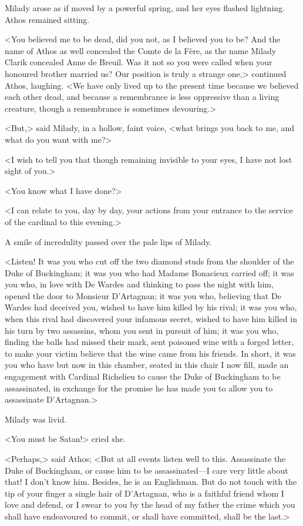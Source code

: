 Milady arose as if moved by a powerful spring, and her eyes flashed lightning. Athos remained sitting. 

<You believed me to be dead, did you not, as I believed you to be? And the name of Athos as well concealed the Comte de la Fère, as the name Milady Clarik concealed Anne de Breuil. Was it not so you were called when your honoured brother married us? Our position is truly a strange one,> continued Athos, laughing. <We have only lived up to the present time because we believed each other dead, and because a remembrance is less oppressive than a living creature, though a remembrance is sometimes devouring.> 

<But,> said Milady, in a hollow, faint voice, <what brings you back to me, and what do you want with me?> 

<I wish to tell you that though remaining invisible to your eyes, I have not lost sight of you.> 

<You know what I have done?> 

<I can relate to you, day by day, your actions from your entrance to the service of the cardinal to this evening.> 

A smile of incredulity passed over the pale lips of Milady. 

<Listen! It was you who cut off the two diamond studs from the shoulder of the Duke of Buckingham; it was you who had Madame Bonacieux carried off; it was you who, in love with De Wardes and thinking to pass the night with him, opened the door to Monsieur D'Artagnan; it was you who, believing that De Wardes had deceived you, wished to have him killed by his rival; it was you who, when this rival had discovered your infamous secret, wished to have him killed in his turn by two assassins, whom you sent in pursuit of him; it was you who, finding the balls had missed their mark, sent poisoned wine with a forged letter, to make your victim believe that the wine came from his friends. In short, it was you who have but now in this chamber, seated in this chair I now fill, made an engagement with Cardinal Richelieu to cause the Duke of Buckingham to be assassinated, in exchange for the promise he has made you to allow you to assassinate D'Artagnan.> 

Milady was livid. 

<You must be Satan!> cried she. 

<Perhaps,> said Athos; <But at all events listen well to this. Assassinate the Duke of Buckingham, or cause him to be assassinated—I care very little about that! I don't know him. Besides, he is an Englishman. But do not touch with the tip of your finger a single hair of D'Artagnan, who is a faithful friend whom I love and defend, or I swear to you by the head of my father the crime which you shall have endeavoured to commit, or shall have committed, shall be the last.> 

